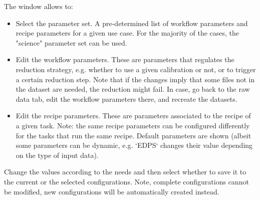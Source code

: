 
The window allows to: 
\begin{itemize}

\item Select the parameter set. A pre-determined list of workflow parameters and recipe parameters for a given 
  use case. For the majority of the cases, the "science" parameter set can be used.

\item Edit the workflow parameters. These are parameters that regulates the reduction strategy, e.g. whether to 
  use a given calibration or not, or to trigger a certain reduction step. Note that if the changes imply that 
  some files not in the dataset are needed, the reduction might fail. In case, go back to the raw data tab, edit the 
  workflow parameters there, and recreate the datasets.

\item Edit the recipe parameters. These are parameters associated to the recipe of a given task. 
  Note: the same recipe parameters can be configured differently for the tasks that run the same recipe.
  Default parameters are shown (albeit some parameters can be dynamic, e.g. `EDPS` changes
  their value depending on the type of input data).  
\end{itemize}

Change the values according to the needs and then select whether to save it to the current or the selected configurations. 
Note, complete configurations cannot be modified, new configurations will be automatically created instead.

